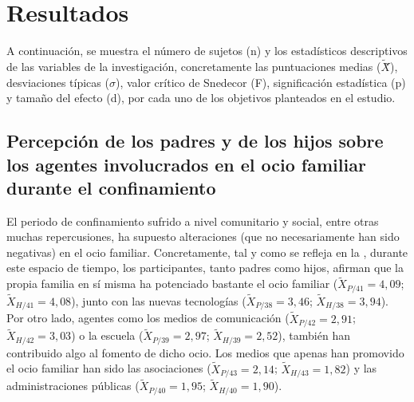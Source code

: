 \documentclass[spanish]{textolivre}
\begin{document}
\section{Resultados}
A continuación, se muestra el número de sujetos (n) y los estadísticos descriptivos de las variables de la investigación, concretamente las puntuaciones medias ($\tilde{X}$̃), desviaciones típicas ($\sigma$), valor crítico de Snedecor (F), significación estadística (p) y tamaño del efecto (d), por cada uno de los objetivos planteados en el estudio.

\subsection{Percepción de los padres y de los hijos sobre los agentes involucrados en el ocio familiar durante el confinamiento}
El periodo de confinamiento sufrido a nivel comunitario y social, entre otras muchas repercusiones, ha supuesto alteraciones (que no necesariamente han sido negativas) en el ocio familiar. Concretamente, tal y como se refleja en la , durante este espacio de tiempo, los participantes, tanto padres como hijos, afirman que la propia familia en sí misma ha potenciado bastante el ocio familiar ($\tilde{X}_{P/41}=4,09$; $\tilde{X}_{H/41}=4,08$), junto con las nuevas tecnologías ($\tilde{X}_{P/38}=3,46$; $\tilde{X}_{H/38}=3,94$). Por otro lado, agentes como los medios de comunicación ($\tilde{X}_{P/42}=2,91$; $\tilde{X}_{H/42}=3,03$) o la escuela ($\tilde{X}_{P/39}=2,97$; $\tilde{X}_{H/39}=2,52$), también han contribuido algo al fomento de dicho ocio. Los medios que apenas han promovido el ocio familiar han sido las asociaciones ($\tilde{X}_{P/43}=2,14$; $\tilde{X}_{H/43}=1,82$) y las administraciones públicas ($\tilde{X}_{P/40}=1,95$; $\tilde{X}_{H/40}=1,90$). 
\end{document}
